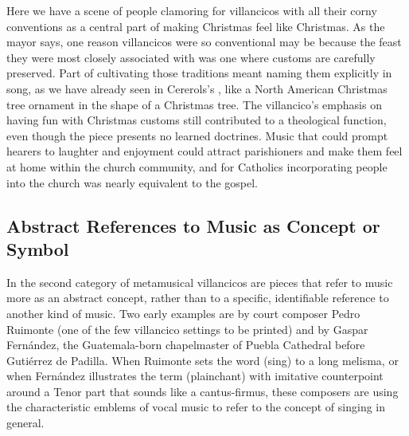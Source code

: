 Here we have a scene of people clamoring for villancicos with all their corny
conventions as a central part of making Christmas feel like Christmas.
As the mayor says, one reason villancicos were so conventional may be because
the feast they were most closely associated with was one where customs are
carefully preserved.
Part of cultivating those traditions meant naming them explicitly in song, as we
have already seen in Cererols's , like a
North American Christmas tree ornament in the shape of a Christmas tree.
The villancico's emphasis on having fun with Christmas customs still
contributed to a theological function, even though the piece presents no
learned doctrines.%
    \Autocite[161--185]{Illari:Polychoral}
Music that could prompt hearers to laughter and enjoyment could attract
parishioners and make them feel at home within the church community, and for
Catholics incorporating people into the church was nearly equivalent to the
gospel.


\subsection{Abstract References to Music as Concept or Symbol}

In the second category of metamusical villancicos are pieces that refer to
music more as an abstract concept, rather than to a specific, identifiable
reference to another kind of music.
Two early examples are  by court composer Pedro
Ruimonte (one of the few villancico settings to be printed) and  by Gaspar Fernández, the Guatemala-born chapelmaster of
Puebla Cathedral before Gutiérrez de Padilla.%
    \Autocites
    {Ruimonte:Parnaso}
    {Fernandez:Cancionero}
    [for crucial emendations to the latter composer's biography, see][]
    {Morales:Fernandez}
When Ruimonte sets the word  (sing) to a long melisma, or when
Fernández illustrates the term  (plainchant) with
imitative counterpoint around a Tenor part that sounds like a cantus-firmus,
these composers are using the characteristic emblems of vocal music to refer to
the concept of singing in general.


